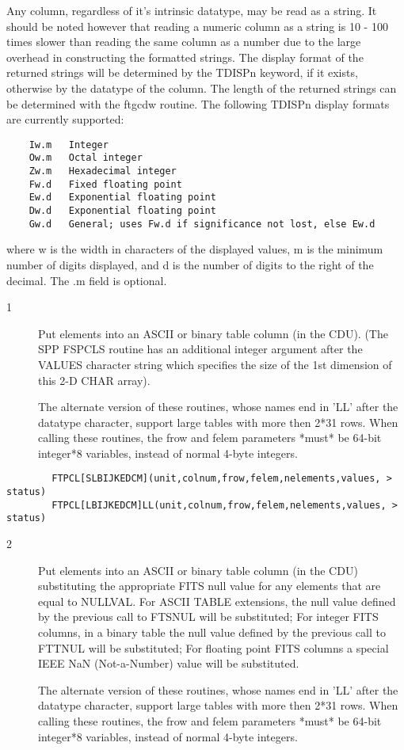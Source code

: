 \documentclass[11pt]{book}
\begin{document}
    Any column, regardless of it's intrinsic datatype, may be read as a
    string.  It should be noted however that reading a numeric column
    as a string is 10 - 100 times slower than reading the same column as
    a number due to the large overhead in constructing the formatted
    strings.    The display format of the returned strings will be
    determined by the TDISPn keyword, if it exists, otherwise by the
    datatype of the column.  The length of the returned strings can be
    determined with the ftgcdw routine.  The following TDISPn display
    formats are currently supported:

\begin{verbatim}
    Iw.m   Integer
    Ow.m   Octal integer
    Zw.m   Hexadecimal integer
    Fw.d   Fixed floating point
    Ew.d   Exponential floating point
    Dw.d   Exponential floating point
    Gw.d   General; uses Fw.d if significance not lost, else Ew.d
\end{verbatim}
  where w is the width in characters of the displayed values, m is the minimum
  number of digits displayed, and d is the number of digits to the right of the
  decimal.  The .m field is optional.


\begin{description}
\item[1 ] Put elements into an ASCII or binary table column (in the CDU).
    (The SPP FSPCLS routine has an additional integer argument after
    the VALUES character string which specifies the size of the 1st
    dimension of this 2-D CHAR array).

    The alternate version of these routines, whose names end in 'LL'
    after the datatype character, support large tables with more then
    2*31 rows.  When calling these routines, the frow and felem parameters
   *must* be 64-bit integer*8 variables, instead of normal 4-byte integers.
\end{description}

\begin{verbatim}
        FTPCL[SLBIJKEDCM](unit,colnum,frow,felem,nelements,values, > status)
        FTPCL[LBIJKEDCM]LL(unit,colnum,frow,felem,nelements,values, > status)
\end{verbatim}

\begin{description}
\item[2 ] Put elements into an ASCII or binary table column (in the CDU)
    substituting the appropriate FITS null value for any elements that
    are equal to NULLVAL.   For ASCII TABLE extensions, the
    null value defined by the previous call to FTSNUL will be substituted;
    For integer FITS columns, in a binary table  the null value
    defined by the previous call to FTTNUL will be substituted;
    For floating point FITS columns a special IEEE NaN (Not-a-Number)
    value will be substituted.

    The alternate version of these routines, whose names end in 'LL'
    after the datatype character, support large tables with more then
    2*31 rows.  When calling these routines, the frow and felem parameters
   *must* be 64-bit integer*8 variables, instead of normal 4-byte integers.
\end{description}
\end{document}
